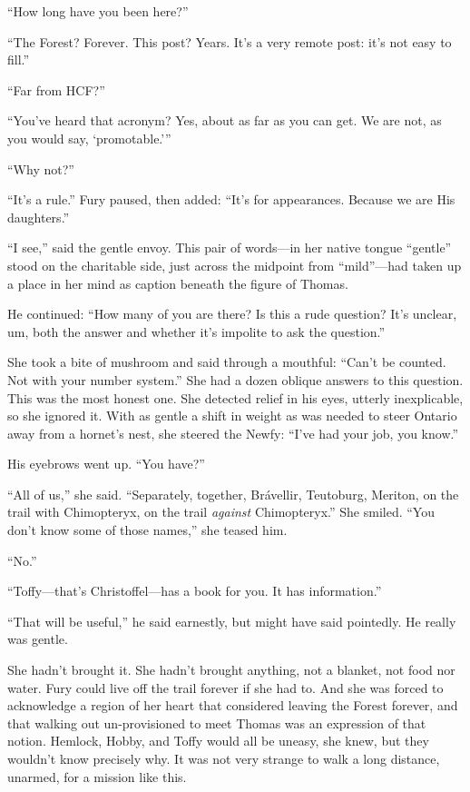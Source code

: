 \documentclass[11pt,a5paper]{article}
\begin{document}
``How long have you been here?''

``The Forest? Forever. This post? Years. It's a very remote post: it's not easy to fill.''

``Far from HCF?''

``You've heard that acronym? Yes, about as far as you can get. We are not, as you would say, `promotable.'''

``Why not?''

``It's a rule.'' Fury paused, then added: ``It's for appearances. Because we are His daughters.''

``I see,'' said the gentle envoy. This pair of words---in her native tongue ``gentle'' stood on the charitable side, just across the midpoint from ``mild''---had taken up a place in her mind as caption beneath the figure of Thomas.

He continued: ``How many of you are there? Is this a rude question? It's unclear, um, both the answer and whether it's impolite to ask the question.''

She took a bite of mushroom and said through a mouthful: ``Can't be counted. Not with your number system.'' She had a dozen oblique answers to this question. This was the most honest one. She detected relief in his eyes, utterly inexplicable, so she ignored it. With as gentle a shift in weight as was needed to steer Ontario away from a hornet's nest, she steered the Newfy: ``I've had your job, you know.''

His eyebrows went up. ``You have?''

``All of us,'' she said. ``Separately, together, Brávellir, Teutoburg, Meriton, on the trail with Chimopteryx, on the trail \emph{against} Chimopteryx.'' She smiled. ``You don't know some of those names,'' she teased him.

``No.''

``Toffy---that's Christoffel---has a book for you. It has information.''

``That will be useful,'' he said earnestly, but might have said pointedly. He really was gentle.

She hadn't brought it. She hadn't brought anything, not a blanket, not food nor water. Fury could live off the trail forever if she had to. And she was forced to acknowledge a region of her heart that considered leaving the Forest forever, and that walking out un-provisioned to meet Thomas was an expression of that notion. Hemlock, Hobby, and Toffy would all be uneasy, she knew, but they wouldn't know precisely why. It was not very strange to walk a long distance, unarmed, for a mission like this.
\end{document}
